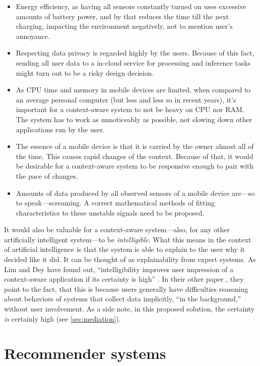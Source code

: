 \begin{itemize}
	\item Energy efficiency, as having all sensors constantly turned on uses excessive amounts of battery power, and by that reduces the time till the next charging, impacting the environment negatively, not to mention user's annoyance.
	\item Respecting data privacy is regarded highly by the users. Because of this fact, sending all user data to a in-cloud service for processing and inference tasks might turn out to be a risky design decision.
	\item As CPU time and memory in mobile devices are limited, when compared to an average personal computer (but less and less so in recent years), it's important for a context-aware system to not be heavy on CPU nor RAM. The system has to work as unnoticeably as possible, not slowing down other applications run by the user.
	\item The essence of a mobile device is that it is carried by the owner almost all of the time. This causes rapid changes of the context. Because of that, it would be desirable for a context-aware system to be responsive enough to pair with the pace of changes.
	\item Amounts of data produced by all observed sensors of a mobile device are---so to speak---screaming. A correct mathematical methods of fitting characteristics to these unstable signals need to be proposed.
\end{itemize}

It would also be valuable for a context-aware system---also, for any other artificially intelligent system---to be \emph{intelligible}. What this means in the context of artificial intelligence is that the system is able to explain to the user why it decided like it did. It can be thought of as explainability from expert systems. As Lim and Dey have found out, ``intelligibility improves user impression of a context-aware application if its certainty is high'' \cite{Dey:intelligibility}. In their other paper \cite{Dey:explainations}, they point to the fact, that this is because users generally have difficulties reasoning about behaviors of systems that collect data implicitly, ``in the background,'' without user involvement. As a side note, in this proposed solution, the certainty \emph{is} certainly high (see \cref{sec:mediation}).

\section{Recommender systems}

